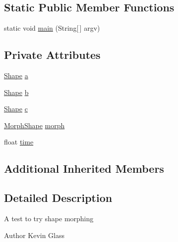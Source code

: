 \subsection*{Static Public Member Functions}
\begin{DoxyCompactItemize}
\item 
static void \mbox{\hyperlink{classorg_1_1newdawn_1_1slick_1_1tests_1_1_morph_shape_test_aaf24e70f71dd9d74f3e54ae9c7880338}{main}} (String\mbox{[}$\,$\mbox{]} argv)
\end{DoxyCompactItemize}
\subsection*{Private Attributes}
\begin{DoxyCompactItemize}
\item 
\mbox{\hyperlink{classorg_1_1newdawn_1_1slick_1_1geom_1_1_shape}{Shape}} \mbox{\hyperlink{classorg_1_1newdawn_1_1slick_1_1tests_1_1_morph_shape_test_aae4a7aae8b258b98057d88786a82d46d}{a}}
\item 
\mbox{\hyperlink{classorg_1_1newdawn_1_1slick_1_1geom_1_1_shape}{Shape}} \mbox{\hyperlink{classorg_1_1newdawn_1_1slick_1_1tests_1_1_morph_shape_test_a8c12651e74bf24e1b5c00aa960c8f655}{b}}
\item 
\mbox{\hyperlink{classorg_1_1newdawn_1_1slick_1_1geom_1_1_shape}{Shape}} \mbox{\hyperlink{classorg_1_1newdawn_1_1slick_1_1tests_1_1_morph_shape_test_aafd5685d9c5de3a529add5a3f44986d2}{c}}
\item 
\mbox{\hyperlink{classorg_1_1newdawn_1_1slick_1_1geom_1_1_morph_shape}{Morph\+Shape}} \mbox{\hyperlink{classorg_1_1newdawn_1_1slick_1_1tests_1_1_morph_shape_test_aa71e79154a050babecb8bdd71caeaedd}{morph}}
\item 
float \mbox{\hyperlink{classorg_1_1newdawn_1_1slick_1_1tests_1_1_morph_shape_test_a8edc97f4a9122efd1e466e12f5c93ff8}{time}}
\end{DoxyCompactItemize}
\subsection*{Additional Inherited Members}


\subsection{Detailed Description}
A test to try shape morphing

\begin{DoxyAuthor}{Author}
Kevin Glass 
\end{DoxyAuthor}


